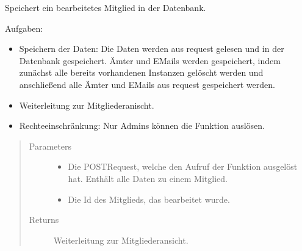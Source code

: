 \documentclass[letterpaper,10pt,english]{sphinxmanual}
\begin{document}
\begin{fulllineitems}
\label{\detokenize{masterCodeDoc:mitglieder.views.speichern}}
Speichert ein bearbeitetes Mitglied in der Datenbank.

Aufgaben:
\begin{itemize}
\item {} 
Speichern der Daten: Die Daten werden aus request gelesen und in der Datenbank gespeichert. Ämter und E\sphinxhyphen{}Mails werden gespeichert, indem zunächst alle bereits vorhandenen Instanzen gelöscht werden
und anschließend alle Ämter und E\sphinxhyphen{}Mails aus request gespeichert werden.

\item {} 
Weiterleitung zur Mitgliederanischt.

\item {} 
Rechteeinschränkung: Nur Admins können die Funktion auslösen.

\end{itemize}
\begin{quote}\begin{description}
\item[{Parameters}] \leavevmode\begin{itemize}
\item {} 
 \textendash{} Die POST\sphinxhyphen{}Request, welche den Aufruf der Funktion ausgelöst hat. Enthält alle Daten zu einem Mitglied.

\item {} 
 \textendash{} Die Id des Mitglieds, das bearbeitet wurde.

\end{itemize}

\item[{Returns}] \leavevmode
Weiterleitung zur Mitgliederansicht.

\end{description}\end{quote}

\end{fulllineitems}

\end{document}
